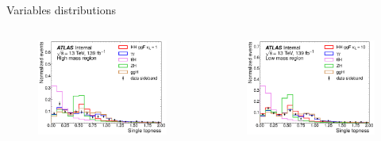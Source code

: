 \begin{frame}{Variables distributions}
\begin{columns}
\begin{figure}
    \centering
    \includegraphics[width=1.\textwidth]{BackUp/Part3/Img/var_SM_single_topness.pdf}
\end{figure}
\begin{figure}
    \centering
    \includegraphics[width=1.\textwidth]{BackUp/Part3/Img/var_BSM_single_topness.pdf}
\end{figure}
\end{columns}
\end{frame}
